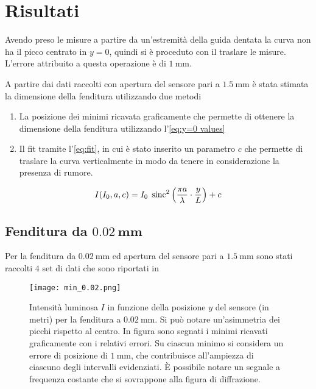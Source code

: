\documentclass[../main.tex]{subfiles}
\begin{document}
\section{Risultati}

Avendo preso le misure a partire da un'estremità della guida dentata la curva non ha il picco centrato in $y = 0$, quindi si è proceduto con il traslare le misure. L'errore attribuito a questa operazione è di $\qty{1}{\mm}$.

A partire dai dati raccolti con apertura del sensore pari a $\qty{1.5}{\mm}$ 
è stata stimata la dimensione della fenditura utilizzando due metodi

\begin{enumerate}
    \item La posizione dei minimi ricavata graficamente che permette di ottenere la dimensione della fenditura utilizzando l'\autoref{eq:y=0 values}
    \item Il fit tramite l'\autoref{eq:fit}, in cui è stato inserito un parametro $c$ che permette di traslare la curva verticalmente in modo da tenere in considerazione la presenza di rumore.
\end{enumerate}

\begin{equation} \label{eq:fit}
    I(I_{0}, a, c) = I_{0} \; \operatorname{sinc}^{2} \left( \frac{\pi a}{\lambda} \cdot \frac{y}{L} \right) + c
\end{equation}

\subsection{Fenditura da $\mathbf{\qty{0.02}{\mm}}$}

Per la fenditura da $\qty{0.02}{\mm}$ ed apertura del sensore pari a $\qty{1.5}{\mm}$ sono stati raccolti $4$ set di dati che sono riportati in %

\begin{figure}[ht!]
    \centering
    \texttt{[image: min\_0.02.png]}
    \caption{Intensità luminosa $I$ in funzione della posizione $y$ del sensore (in metri) per la fenditura a $\qty{0.02}{\milli\metre}$. Si può notare un'asimmetria dei picchi rispetto al centro. In figura sono segnati i minimi ricavati graficamente con i relativi errori. Su ciascun minimo si considera un errore di posizione di $\qty{1}{\mm}$, che contribuisce all'ampiezza di ciascuno degli intervalli evidenziati. È possibile notare un segnale a frequenza costante che si sovrappone alla figura di diffrazione.} %
    \label{fig:minimi 0.02}
\end{figure}
\end{document}
